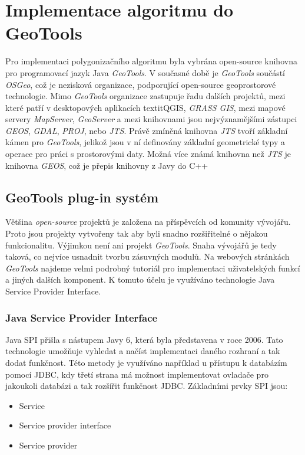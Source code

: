 \chapter{Implementace algoritmu do GeoTools}
\label{chap:implementacealgoritmudogeotools}
	Pro implementaci polygonizačního algoritmu byla vybrána open-source knihovna pro programovací jazyk Java \textit{GeoTools}. V současné době je \textit{GeoTools} součástí \textit{OSGeo}, což je nezisková organizace, podporující open-source geoprostorové technologie. Mimo \textit{GeoTools} organizace zastupuje řadu dalších projektů, mezi které patří v desktopových aplikacích textit{QGIS}, \textit{GRASS GIS}, mezi mapové servery \textit{MapServer}, \textit{GeoServer} a mezi knihovnami jsou nejvýznamějšími zástupci \textit{GEOS}, \textit{GDAL}, \textit{PROJ}, nebo \textit{JTS}. Právě zmíněná knihovna \textit{JTS} tvoří základní kámen pro \textit{GeoTools}, jelikož jsou v ní definovány základní geometrické typy a operace pro práci s prostorovými daty. Možná více známá knihovna než \textit{JTS} je knihovna \textit{GEOS}, což je přepis knihovny z Javy do C++~\cite{OSGeo,GeoTools}
	
\section{GeoTools plug-in systém}
	Většina \textit{open-source} projektů je založena na příspěvcích od komunity vývojářu. Proto jsou projekty vytvořeny tak aby byli snadno rozšiřitelné o nějakou funkcionalitu. Výjimkou není ani projekt \textit{GeoTools}. Snaha vývojářů je tedy taková, co nejvíce usnadnit tvorbu zásuvných modulů. Na webových stránkách \textit{GeoTools}\cite{GeoTools} najdeme velmi podrobný tutoriál pro implementaci uživatelských funkcí a jiných dalších komponent. K tomuto účelu je využíváno technologie Java Service Provider Interface.
	
\subsection{Java Service Provider Interface}
	Java SPI přišla s nástupem Javy 6, která byla představena v roce 2006. Tato technologie umožňuje vyhledat a načíst implementaci daného rozhraní a tak dodat funkčnost. Této metody je využíváno například u přístupu k databázím pomocí JDBC, kdy třetí strana má možnost implementovat ovladače pro jakoukoli databázi a tak rozšířit funkčnost JDBC. Základními prvky SPI jsou:
	
\begin{itemize}
	\item Service
	\item Service provider interface
	\item Service provider
\end{itemize}	
	

